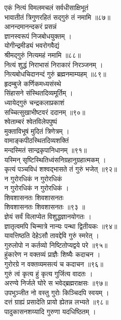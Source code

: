 एकं नित्यं विमलमचलं सर्वधीसाक्षिभूतं\\
भावातीतं त्रिगुणरहितं सद्गुरुं तं नमामि ॥८७॥\\
आनन्दमानन्दकरं प्रसन्नं\\
ज्ञानस्वरूपं निजबोधयुक्तम् ।\\
योगीन्द्रमीड्यं भवरोगवैद्यं\\
श्रीमद्गुरुं नित्यमहं नमामि ॥८८॥\\
नित्यं शुद्धं निराभासं निराकारं निरञ्जनम् ।\\
नित्यबोधचिदानन्दं गुरुं ब्रह्मनमाम्यहम् ॥८९॥\\
हृदम्बुजे कर्णिकमध्यसंस्थे\\
सिंहासने संस्थितदिव्यमूर्तिम् ।\\
ध्यायेद्गुरुं चन्द्रकलाप्रकाशं\\
सच्चित्सुखाभीष्टवरं ददानम् ॥९०॥\\
श्वेताम्बरं श्वेतविलेपपुष्पं\\
मुक्ताविभूषं मुदितं त्रिणेत्रम् ।\\
वामाङ्कपीठस्थितदिव्यशक्तिं\\
मन्दस्मितं सान्द्रकृपानिधानम् ॥९१॥\\
यस्मिन् सृष्टिस्थितिध्वंसनिग्रहानुग्रहात्मकम् ।\\
कृत्यं पञ्चविधं शश्वद्भासते तं गुरुं भजेत् ॥९२॥\\
न गुरोरधिकं न गुरोरधिकं\\
न गुरोरधिकं न गुरोरधिकं ।\\
शिवशासनतः शिवशासनतः\\
शिवशासनतः शिवशासनतः ॥९३ ॥\\
ज्ञेयं सर्वं विलाप्येत विशुद्धज्ञानयोगतः ।\\
ज्ञातृत्वमपि चिन्मात्रे नान्यः पन्था द्वितीयकः ॥९४॥\\
यावत्तिष्ठति देहेऽसौ तावद्देवि गुरुं स्मरेत् ।\\
गुरुलोपो न कर्तव्यो निष्टितोप्यद्वये परे ॥९५॥\\
हुंकारेण न वक्तव्यं प्राज्ञैः शिष्यैः कदाचन ।\\
गुरोरग्रे न वक्तव्यमसत्यं च कदाचन ॥९६॥\\ 
गुरुं त्वं कृत्य हुं कृत्य गुर्जित्य वादतः ।\\
अरण्ये निर्जले घोरे स भवेद्‍ब्रह्मराक्षसः ॥९७॥\\
उपभुञ्जीत नो वस्तु गुरोः किञ्चिदपि स्वयम् ।\\
दत्तं ग्राह्यं  प्रसादेति प्रायो ह्येतन्न लभ्यते ॥९८॥\\
पादुकासनशय्यादि गुरुणा यदधिष्ठितम् ।\\
